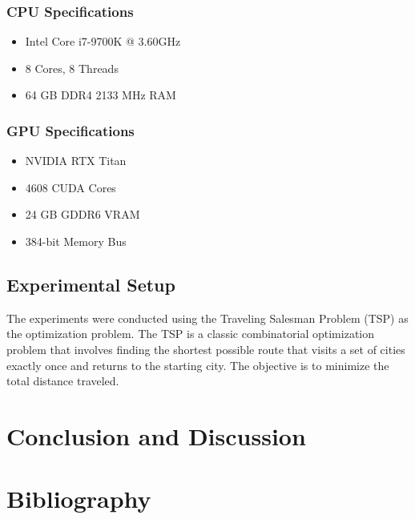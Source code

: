 \documentclass[conference]{IEEEtran}
\begin{document}
\subsubsection{CPU Specifications}
\begin{itemize}
    \item Intel Core i7-9700K @ 3.60GHz
    \item 8 Cores, 8 Threads
    \item 64 GB DDR4 2133 MHz RAM
\end{itemize}

\subsubsection{GPU Specifications}
\begin{itemize}
    \item NVIDIA RTX Titan
    \item 4608 CUDA Cores
    \item 24 GB GDDR6 VRAM
    \item 384-bit Memory Bus
\end{itemize}

\subsection{Experimental Setup}
The experiments were conducted using the Traveling Salesman Problem (TSP) as
the optimization problem. The TSP is a classic combinatorial optimization
problem that involves finding the shortest possible route that visits a set of
cities exactly once and returns to the starting city. The objective is to
minimize the total distance traveled.

\section{Conclusion and Discussion}

\section{Bibliography}
\end{document}
